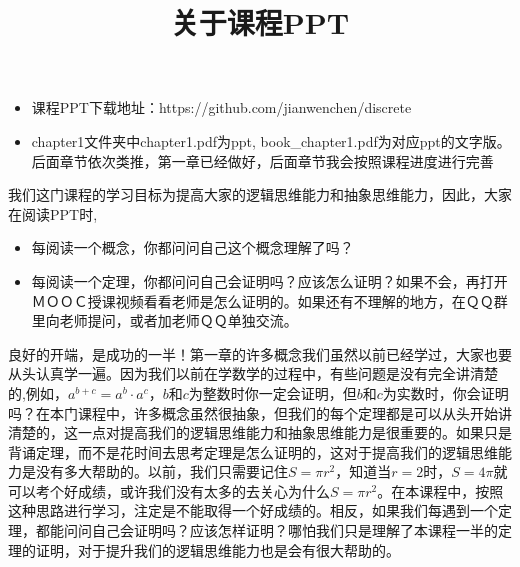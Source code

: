 \documentclass{article}
\begin{document}
\begin{CJK}{UTF8}{gbsn}
  \title{关于课程PPT}
\maketitle
  
\begin{itemize}
\item 课程PPT下载地址：https://github.com/jianwenchen/discrete
\item chapter1文件夹中chapter1.pdf为ppt, book\_chapter1.pdf为对应ppt的文字版。后面章节依次类推，第一章已经做好，后面章节我会按照课程进度进行完善
\end{itemize}



我们这门课程的学习目标为提高大家的逻辑思维能力和抽象思维能力，因此，大家在阅读PPT时,

\begin{itemize}
\item 每阅读一个概念，你都问问自己这个概念理解了吗？
\item 每阅读一个定理，你都问问自己会证明吗？应该怎么证明？如果不会，再打开ＭＯＯＣ授课视频看看老师是怎么证明的。如果还有不理解的地方，在ＱＱ群里向老师提问，或者加老师ＱＱ单独交流。
\end{itemize}

良好的开端，是成功的一半！第一章的许多概念我们虽然以前已经学过，大家也要从头认真学一遍。因为我们以前在学数学的过程中，有些问题是没有完全讲清楚的,例如，$a^{b+c}=a^b\cdot a^c$，$b$和$c$为整数时你一定会证明，但$b$和$c$为实数时，你会证明吗？在本门课程中，许多概念虽然很抽象，但我们的每个定理都是可以从头开始讲清楚的，这一点对提高我们的逻辑思维能力和抽象思维能力是很重要的。如果只是背诵定理，而不是花时间去思考定理是怎么证明的，这对于提高我们的逻辑思维能力是没有多大帮助的。以前，我们只需要记住$S=\pi r^2$，知道当$r=2$时，$S=4\pi$就可以考个好成绩，或许我们没有太多的去关心为什么$S=\pi r^2$。在本课程中，按照这种思路进行学习，注定是不能取得一个好成绩的。相反，如果我们每遇到一个定理，都能问问自己会证明吗？应该怎样证明？哪怕我们只是理解了本课程一半的定理的证明，对于提升我们的逻辑思维能力也是会有很大帮助的。





\end{CJK}
\end{document}
